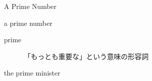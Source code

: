 \documentclass[aspectratio=169,xcolor={dvipsnames,table}]{beamer}
\makeatletter
\newcommand*{\themonth}{\two@digits\month}
\newcommand*{\theday}{\two@digits\day}
\newcommand{\mytoday}{{\the\year}--{\themonth}--{\theday}}
\makeatother
\begin{document}
%
%
%
%
%
%
%
{
  \begin{frame}
  \end{frame}
}

\begin{frame}[plain]{A Prime Number}
\Large
\pause

 a prime number

\pause
\begin{description}
 \item[prime] 「もっとも重要な」という意味の形容詞
\end{description}

\pause

\bigskip
\hfill{}the prime minister

\end{frame}
\end{document}
